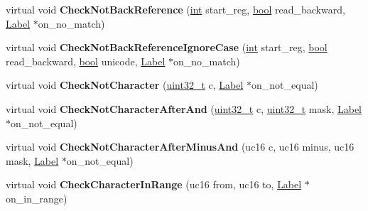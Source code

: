 \begin{DoxyCompactItemize}
\mbox{\label{classv8_1_1internal_1_1RegExpMacroAssemblerMIPS_af33344a5d113a2f1318f2549554fdaca}} 
virtual void {\bfseries Check\+Not\+Back\+Reference} (\mbox{\hyperlink{classint}{int}} start\+\_\+reg, \mbox{\hyperlink{classbool}{bool}} read\+\_\+backward, \mbox{\hyperlink{classv8_1_1internal_1_1Label}{Label}} $\ast$on\+\_\+no\+\_\+match)
\item 
\mbox{\label{classv8_1_1internal_1_1RegExpMacroAssemblerMIPS_a797e74e54cda0b9368dbe36c8f9bb704}} 
virtual void {\bfseries Check\+Not\+Back\+Reference\+Ignore\+Case} (\mbox{\hyperlink{classint}{int}} start\+\_\+reg, \mbox{\hyperlink{classbool}{bool}} read\+\_\+backward, \mbox{\hyperlink{classbool}{bool}} unicode, \mbox{\hyperlink{classv8_1_1internal_1_1Label}{Label}} $\ast$on\+\_\+no\+\_\+match)
\item 
\mbox{\label{classv8_1_1internal_1_1RegExpMacroAssemblerMIPS_af2c6643d958982b07b49338a10e0f07c}} 
virtual void {\bfseries Check\+Not\+Character} (\mbox{\hyperlink{classuint32__t}{uint32\+\_\+t}} c, \mbox{\hyperlink{classv8_1_1internal_1_1Label}{Label}} $\ast$on\+\_\+not\+\_\+equal)
\item 
\mbox{\label{classv8_1_1internal_1_1RegExpMacroAssemblerMIPS_a672b956cbe01255fa2996705b9bedb53}} 
virtual void {\bfseries Check\+Not\+Character\+After\+And} (\mbox{\hyperlink{classuint32__t}{uint32\+\_\+t}} c, \mbox{\hyperlink{classuint32__t}{uint32\+\_\+t}} mask, \mbox{\hyperlink{classv8_1_1internal_1_1Label}{Label}} $\ast$on\+\_\+not\+\_\+equal)
\item 
\mbox{\label{classv8_1_1internal_1_1RegExpMacroAssemblerMIPS_a09f76a20823593559fb72f4ce3e556d9}} 
virtual void {\bfseries Check\+Not\+Character\+After\+Minus\+And} (uc16 c, uc16 minus, uc16 mask, \mbox{\hyperlink{classv8_1_1internal_1_1Label}{Label}} $\ast$on\+\_\+not\+\_\+equal)
\item 
\mbox{\label{classv8_1_1internal_1_1RegExpMacroAssemblerMIPS_a233eb5196a3ef4cfc2c67770f5ebba4f}} 
virtual void {\bfseries Check\+Character\+In\+Range} (uc16 from, uc16 to, \mbox{\hyperlink{classv8_1_1internal_1_1Label}{Label}} $\ast$on\+\_\+in\+\_\+range)

\end{DoxyCompactItemize}
